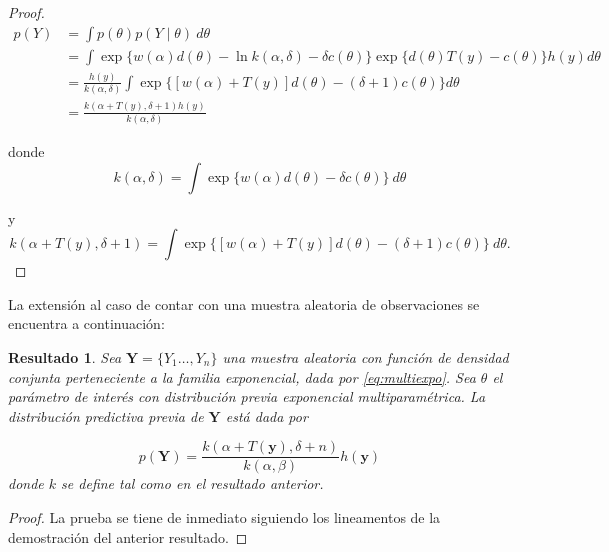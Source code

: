 \documentclass[
  10pt,
  spanish,
]{book}
\newtheorem{proposition}{Resultado}[chapter]
\theoremstyle{definition}
\theoremstyle{definition}
\theoremstyle{definition}
\theoremstyle{definition}
\theoremstyle{remark}
\begin{document}
\begin{proof}
{}\begin{align*}
p(Y)&=\int p(\theta)p(Y \mid \theta)\ d\theta\\
&=\int \exp\{w(\alpha) d(\theta)-\ln k(\alpha,\delta)-\delta c(\theta)\}\exp\{d(\theta)T(y)-c(\theta)\}h(y)d\theta\\
&=\frac{h(y)}{k(\alpha,\delta)}\int \exp\{[w(\alpha)+T(y)]d(\theta)-(\delta+1)c(\theta)\}d\theta\\
&=\frac{k(\alpha+T(y),\delta+1)h(y)}{k(\alpha,\delta)}
\end{align*}

donde
\begin{equation*}
k(\alpha,\delta)=\int \exp\{w(\alpha) d(\theta)-\delta c(\theta)\}\ d\theta
\end{equation*}

y
\begin{equation*}
k(\alpha+T(y),\delta+1)=\int \exp\{[w(\alpha)+T(y)]d(\theta)-(\delta+1)c(\theta)\} \ d\theta.
\end{equation*}
\end{proof}

La extensión al caso de contar con una muestra aleatoria de
observaciones se encuentra a continuación:

\begin{proposition}
\protect\hypertarget{prp:unnamed-chunk-11}{}{\label{prp:unnamed-chunk-11} }Sea \(\mathbf{Y}=\{Y_1\ldots,Y_n\}\) una muestra aleatoria con función de densidad conjunta perteneciente a la familia exponencial, dada por \eqref{eq:multiexpo}. Sea \(\theta\) el parámetro de interés con distribución previa exponencial multiparamétrica. La distribución predictiva previa de \(\mathbf{Y}\) está dada por

\begin{equation}
p(\mathbf{Y})=\frac{k(\alpha+T(\mathbf{y}),\delta+n)}{k(\alpha,\beta)}h(\mathbf{y})
\end{equation}
donde \(k\) se define tal como en el resultado anterior.
\end{proposition}

\begin{proof}
{}La prueba se tiene de inmediato siguiendo los lineamentos de la demostración del anterior resultado.
\end{proof}
\end{document}
